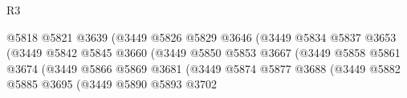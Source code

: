 \begin{lexlean}{R3}
\begin{coremodule}
                                                    @5818
                                                    @5821
                                                    @3639
                                                    (@3449
                                                      @5826
                                                      @5829
                                                      @3646
                                                      (@3449
                                                        @5834
                                                        @5837
                                                        @3653
                                                        (@3449
                                                          @5842
                                                          @5845
                                                          @3660
                                                          (@3449
                                                            @5850
                                                            @5853
                                                            @3667
                                                            (@3449
                                                              @5858
                                                              @5861
                                                              @3674
                                                              (@3449
                                                                @5866
                                                                @5869
                                                                @3681
                                                                (@3449
                                                                  @5874
                                                                  @5877
                                                                  @3688
                                                                  (@3449
                                                                    @5882
                                                                    @5885
                                                                    @3695
                                                                    (@3449
                                                                      @5890
                                                                      @5893
                                                                      @3702

\end{coremodule}
\end{lexlean}
